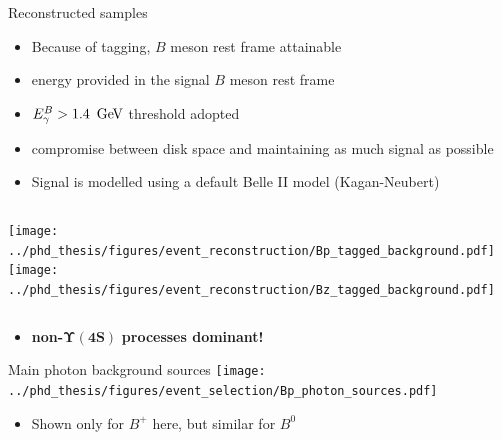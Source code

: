 \documentclass[xcolor=dvipsnames]{beamer}
\begin{document}
\begin{frame}{Reconstructed samples}
   \scriptsize
   \begin{itemize}
      \item Because of tagging, $B$ meson rest frame attainable
      \item[\ra] energy provided in the signal $B$ meson rest frame
      \item ${E^B_{\gamma}}>1.4~\mathrm{\,Ge\kern -0.1em V}$ threshold adopted
      \item[\ra] compromise between disk space and maintaining as much signal as possible
      \item Signal is modelled using a default Belle II model (Kagan-Neubert)

   \end{itemize}
   \begin{columns}
      \texttt{[image: ../phd\_thesis/figures/event\_reconstruction/Bp\_tagged\_background.pdf]}
      \texttt{[image: ../phd\_thesis/figures/event\_reconstruction/Bz\_tagged\_background.pdf]}
   \end{columns}
   \begin{itemize}
      \item[\ra] \textbf{non-}$\bm{\Upsilon(4S)}$ \textbf{processes dominant!}
   \end{itemize}
\end{frame}

\begin{frame}{Main photon background sources}
\centering\scriptsize
      \texttt{[image: ../phd\_thesis/figures/event\_selection/Bp\_photon\_sources.pdf]}

      \begin{itemize}
         \item[\ra] Shown only for $B^+$ here, but similar for $B^0$
      \end{itemize}


\end{frame}
\end{document}
